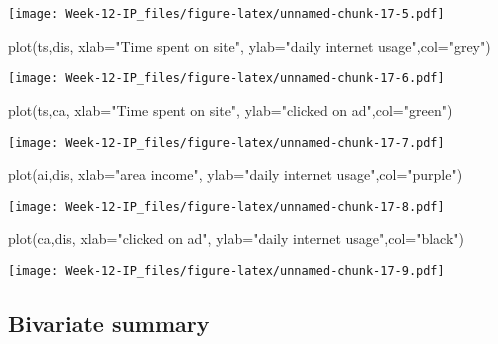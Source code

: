 \documentclass[
]{article}
\newenvironment{Shaded}{\begin{snugshade}}{\end{snugshade}}
\newcommand{\AttributeTok}[1]{\textcolor[rgb]{0.77,0.63,0.00}{#1}}
\newcommand{\FunctionTok}[1]{\textcolor[rgb]{0.00,0.00,0.00}{#1}}
\newcommand{\NormalTok}[1]{#1}
\newcommand{\StringTok}[1]{\textcolor[rgb]{0.31,0.60,0.02}{#1}}
\begin{document}
\texttt{[image: Week-12-IP\_files/figure-latex/unnamed-chunk-17-5.pdf]}

\begin{Shaded}
\begin{Highlighting}[]
\FunctionTok{plot}\NormalTok{(ts,dis, }\AttributeTok{xlab=}\StringTok{"Time spent on site"}\NormalTok{, }\AttributeTok{ylab=}\StringTok{"daily internet usage"}\NormalTok{,}\AttributeTok{col=}\StringTok{"grey"}\NormalTok{)}
\end{Highlighting}
\end{Shaded}

\texttt{[image: Week-12-IP\_files/figure-latex/unnamed-chunk-17-6.pdf]}

\begin{Shaded}
\begin{Highlighting}[]
\FunctionTok{plot}\NormalTok{(ts,ca, }\AttributeTok{xlab=}\StringTok{"Time spent on site"}\NormalTok{, }\AttributeTok{ylab=}\StringTok{"clicked on ad"}\NormalTok{,}\AttributeTok{col=}\StringTok{"green"}\NormalTok{)}
\end{Highlighting}
\end{Shaded}

\texttt{[image: Week-12-IP\_files/figure-latex/unnamed-chunk-17-7.pdf]}

\begin{Shaded}
\begin{Highlighting}[]
\FunctionTok{plot}\NormalTok{(ai,dis, }\AttributeTok{xlab=}\StringTok{"area income"}\NormalTok{, }\AttributeTok{ylab=}\StringTok{"daily internet usage"}\NormalTok{,}\AttributeTok{col=}\StringTok{"purple"}\NormalTok{)}
\end{Highlighting}
\end{Shaded}

\texttt{[image: Week-12-IP\_files/figure-latex/unnamed-chunk-17-8.pdf]}

\begin{Shaded}
\begin{Highlighting}[]
\FunctionTok{plot}\NormalTok{(ca,dis, }\AttributeTok{xlab=}\StringTok{"clicked on ad"}\NormalTok{, }\AttributeTok{ylab=}\StringTok{"daily internet usage"}\NormalTok{,}\AttributeTok{col=}\StringTok{"black"}\NormalTok{)}
\end{Highlighting}
\end{Shaded}

\texttt{[image: Week-12-IP\_files/figure-latex/unnamed-chunk-17-9.pdf]}

\hypertarget{bivariate-summary}{%
\subsection{Bivariate summary}\label{bivariate-summary}}
\end{document}
